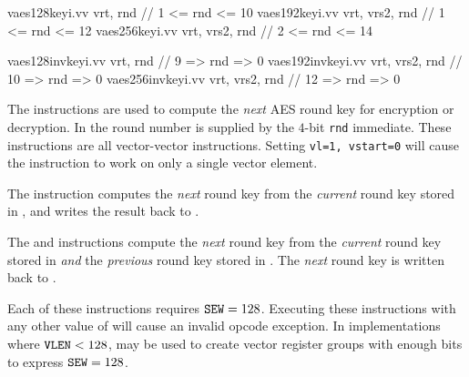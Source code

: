 \begin{cryptoisa}
vaes128keyi.vv    vrt,       rnd    // 1  <= rnd <= 10
vaes192keyi.vv    vrt, vrs2, rnd    // 1  <= rnd <= 12
vaes256keyi.vv    vrt, vrs2, rnd    // 2  <= rnd <= 14

vaes128invkeyi.vv vrt,       rnd    // 9  => rnd =>  0
vaes192invkeyi.vv vrt, vrs2, rnd    // 10 => rnd =>  0
vaes256invkeyi.vv vrt, vrs2, rnd    // 12 => rnd =>  0
\end{cryptoisa}

The  instructions
are used to compute the {\em next} AES round key for encryption
or decryption.
In the round number is supplied by the $4$-bit {\tt rnd} immediate.
These instructions are all vector-vector instructions.
Setting {\tt vl=1, vstart=0} will cause the instruction to work on only a
single vector element.

The  instruction computes
the {\em next} round key
from the
{\em current} round key
stored in \vrt,
and writes the result back to \vrt.

The  and  instructions
compute the {\em next} round key
from the
{\em current} round key stored in  {\em and}
the {\em previous} round key stored in \vrt.
The {\em next} round key is written back to \vrt.

Each of these instructions requires ${\tt SEW}=128$.
Executing these instructions with any other value of \SEW will cause
an invalid opcode exception.
In implementations where ${\tt VLEN}<128$, \LMUL may be used to create
vector register groups with enough bits to express ${\tt SEW}=128$.

%
%
%
%
%
%
%
%
%
%
%
%
%

